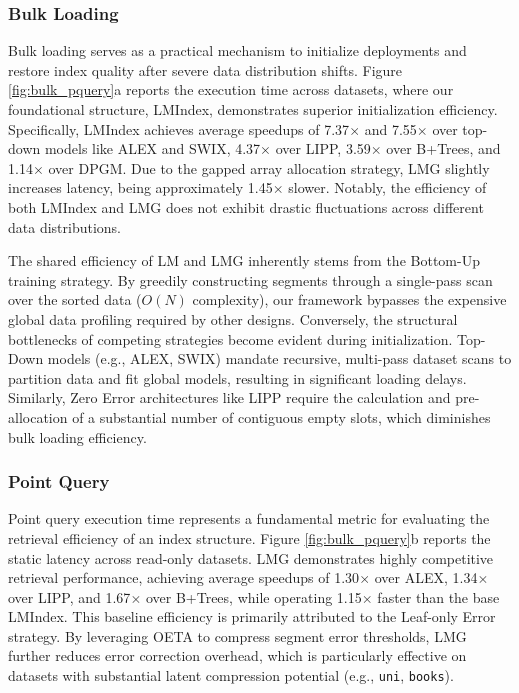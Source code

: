 \subsubsection{Bulk Loading}
Bulk loading serves as a practical mechanism to initialize deployments and restore index quality after severe data distribution shifts. Figure \ref{fig:bulk_pquery}a reports the execution time across datasets, where our foundational structure, LMIndex, demonstrates superior initialization efficiency. Specifically, LMIndex achieves average speedups of 7.37$\times$ and 7.55$\times$ over top-down models like ALEX and SWIX, 4.37$\times$ over LIPP, 3.59$\times$ over B+Trees, and 1.14$\times$ over DPGM. Due to the gapped array allocation strategy, LMG slightly increases latency, being approximately 1.45$\times$ slower. Notably, the efficiency of both LMIndex and LMG does not exhibit drastic fluctuations across different data distributions.

The shared efficiency of LM and LMG inherently stems from the Bottom-Up training strategy. By greedily constructing segments through a single-pass scan over the sorted data ($O(N)$ complexity), our framework bypasses the expensive global data profiling required by other designs. Conversely, the structural bottlenecks of competing strategies become evident during initialization. Top-Down models (e.g., ALEX, SWIX) mandate recursive, multi-pass dataset scans to partition data and fit global models, resulting in significant loading delays. Similarly, Zero Error architectures like LIPP require the calculation and pre-allocation of a substantial number of contiguous empty slots, which diminishes bulk loading efficiency.

\subsubsection{Point Query}
\label{sec:point_query}
Point query execution time represents a fundamental metric for evaluating the retrieval efficiency of an index structure. Figure \ref{fig:bulk_pquery}b reports the static latency across read-only datasets. LMG demonstrates highly competitive retrieval performance, achieving average speedups of 1.30$\times$ over ALEX, 1.34$\times$ over LIPP, and 1.67$\times$ over B+Trees, while operating 1.15$\times$ faster than the base LMIndex. This baseline efficiency is primarily attributed to the Leaf-only Error strategy. By leveraging OETA to compress segment error thresholds, LMG further reduces error correction overhead, which is particularly effective on datasets with substantial latent compression potential (e.g., \texttt{uni}, \texttt{books}).

